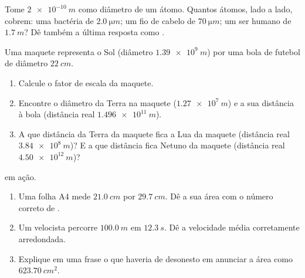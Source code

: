 \begin{exercise}[$\star\star$]\label{exo:g10:orders-of-magnitude:9}
Tome $\qty{2e-10}{m}$ como diâmetro de um átomo. Quantos átomos, lado a
lado, cobrem: uma bactéria de $\qty{2.0}{\micro m}$; um fio de cabelo de
$\qty{70}{\micro m}$; um ser humano de $\qty{1.7}{m}$? Dê também a
última resposta como .
\end{exercise}

\begin{exercise}[$\star\star$]\label{exo:g10:orders-of-magnitude:10}
Uma maquete representa o Sol (diâmetro $\qty{1.39e9}{m}$) por uma bola
de futebol de diâmetro $\qty{22}{cm}$.
\begin{enumerate}
  \item Calcule o fator de escala da maquete.
  \item Encontre o diâmetro da Terra na maquete ($\qty{1.27e7}{m}$) e a
        sua distância à bola (distância real $\qty{1.496e11}{m}$).
  \item A que distância da Terra da maquete fica a Lua da maquete
        (distância real $\qty{3.84e8}{m}$)? E a que distância fica
        Netuno da maquete (distância real $\qty{4.50e12}{m}$)?
\end{enumerate}
\end{exercise}

\begin{exercise}[$\star\star$]\label{exo:g10:orders-of-magnitude:11}
 em ação.
\begin{enumerate}
  \item Uma folha A4 mede $\qty{21.0}{cm}$ por $\qty{29.7}{cm}$. Dê a
        sua área com o número correto de .
  \item Um velocista percorre $\qty{100.0}{m}$ em $\qty{12.3}{s}$. Dê a
        velocidade média corretamente arredondada.
  \item Explique em uma frase o que haveria de desonesto em anunciar a
        área como $\qty{623.70}{cm^2}$.
\end{enumerate}
\end{exercise}

